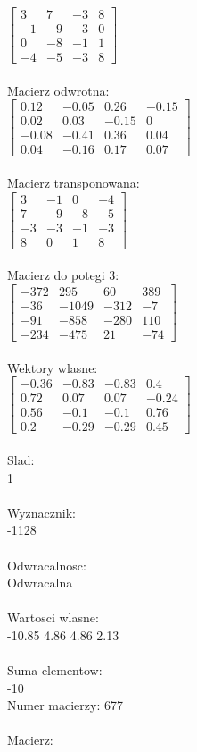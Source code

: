 \documentclass[a4paper,12pt]{article}
\begin{document}
$\begin{bmatrix} 3&7&-3&8\\-1&-9&-3&0\\0&-8&-1&1\\-4&-5&-3&8 \end{bmatrix}$
\\
\\
Macierz odwrotna:\\

$\begin{bmatrix} 0.12&-0.05&0.26&-0.15\\0.02&0.03&-0.15&0\\-0.08&-0.41&0.36&0.04\\0.04&-0.16&0.17&0.07 \end{bmatrix}$
\\
\\
Macierz transponowana:\\

$\begin{bmatrix} 3&-1&0&-4\\7&-9&-8&-5\\-3&-3&-1&-3\\8&0&1&8 \end{bmatrix}$
\\
\\
Macierz do potegi 3:\\

$\begin{bmatrix} -372&295&60&389\\-36&-1049&-312&-7\\-91&-858&-280&110\\-234&-475&21&-74 \end{bmatrix}$
\\
\\
Wektory wlasne:\\

$\begin{bmatrix} -0.36&-0.83&-0.83&0.4\\0.72&0.07&0.07&-0.24\\0.56&-0.1&-0.1&0.76\\0.2&-0.29&-0.29&0.45 \end{bmatrix}$
\\
\\
Slad:\\
1
\\
\\
Wyznacznik:\\
-1128
\\
\\
Odwracalnosc:\\
Odwracalna
\\
\\
Wartosci wlasne:\\
-10.85 4.86 4.86 2.13
\\
\\
Suma elementow:\\
-10
\\
\newpage
Numer macierzy:
677
\\
\\
Macierz:\\
\end{document}
